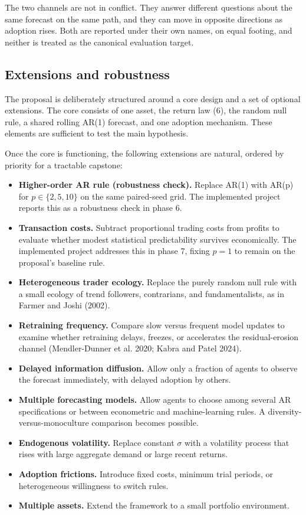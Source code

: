 \documentclass[11pt]{article}
\begin{document}
The two channels are not in conflict. They answer different questions about the same forecast on the same path, and they can move in opposite directions as adoption rises. Both are reported under their own names, on equal footing, and neither is treated as the canonical evaluation target.

\subsection{Extensions and robustness}

The proposal is deliberately structured around a core design and a set of optional extensions. The core consists of one asset, the return law (6), the random null rule, a shared rolling AR(1) forecast, and one adoption mechanism. These elements are sufficient to test the main hypothesis.

Once the core is functioning, the following extensions are natural, ordered by priority for a tractable capstone:

\begin{itemize}[itemsep=0.2em]
  \item \textbf{Higher-order AR rule (robustness check).} Replace AR(1) with AR(p) for $p \in \{2, 5, 10\}$ on the same paired-seed grid. The implemented project reports this as a robustness check in phase 6.
  \item \textbf{Transaction costs.} Subtract proportional trading costs from profits to evaluate whether modest statistical predictability survives economically. The implemented project addresses this in phase 7, fixing $p = 1$ to remain on the proposal's baseline rule.
  \item \textbf{Heterogeneous trader ecology.} Replace the purely random null rule with a small ecology of trend followers, contrarians, and fundamentalists, as in Farmer and Joshi (2002).
  \item \textbf{Retraining frequency.} Compare slow versus frequent model updates to examine whether retraining delays, freezes, or accelerates the residual-erosion channel (Mendler-Dunner et al. 2020; Kabra and Patel 2024).
  \item \textbf{Delayed information diffusion.} Allow only a fraction of agents to observe the forecast immediately, with delayed adoption by others.
  \item \textbf{Multiple forecasting models.} Allow agents to choose among several AR specifications or between econometric and machine-learning rules. A diversity-versus-monoculture comparison becomes possible.
  \item \textbf{Endogenous volatility.} Replace constant $\sigma$ with a volatility process that rises with large aggregate demand or large recent returns.
  \item \textbf{Adoption frictions.} Introduce fixed costs, minimum trial periods, or heterogeneous willingness to switch rules.
  \item \textbf{Multiple assets.} Extend the framework to a small portfolio environment.
\end{itemize}
\end{document}
